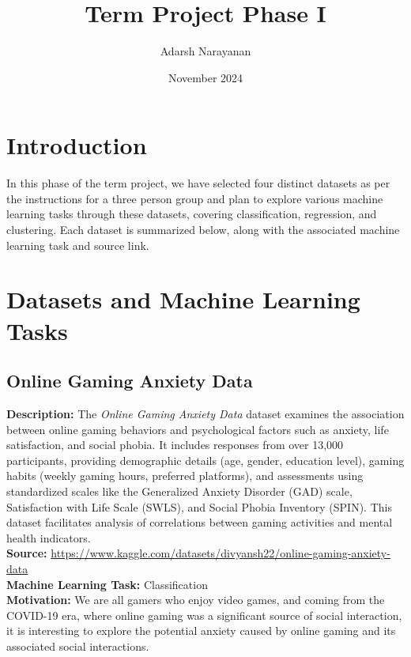 \documentclass{article}
\title{Term Project Phase I}
\author{Adarsh Narayanan}
\date{November 2024}
\begin{document}
\maketitle

\section{Introduction}

In this phase of the term project, we have selected four distinct datasets as per the instructions for a three person group and plan to explore various machine learning tasks through these datasets, covering classification, regression, and clustering. Each dataset is summarized below, along with the associated machine learning task and source link.

\section{Datasets and Machine Learning Tasks} 

\vspace{0.4cm}

\subsection{Online Gaming Anxiety Data}
\textbf{Description:} The \textit{Online Gaming Anxiety Data} dataset examines the association between online gaming behaviors and psychological factors such as anxiety, life satisfaction, and social phobia. It includes responses from over 13,000 participants, providing demographic details (age, gender, education level), gaming habits (weekly gaming hours, preferred platforms), and assessments using standardized scales like the Generalized Anxiety Disorder (GAD) scale, Satisfaction with Life Scale (SWLS), and Social Phobia Inventory (SPIN). This dataset facilitates analysis of correlations between gaming activities and mental health indicators. \\

\textbf{Source:} \href{https://www.kaggle.com/datasets/divyansh22/online-gaming-anxiety-data}{https://www.kaggle.com/datasets/divyansh22/online-gaming-anxiety-data}\\

\textbf{Machine Learning Task:} Classification \\

\textbf{Motivation:} We are all gamers who enjoy video games, and coming from the COVID-19 era, where online gaming was a significant source of social interaction, it is interesting to explore the potential anxiety caused by online gaming and its associated social interactions. \\
\end{document}
